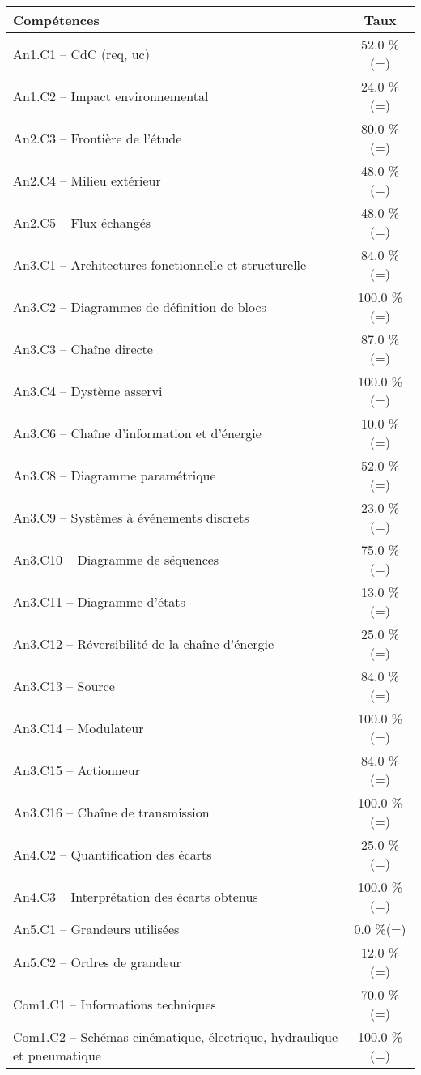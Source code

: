 \footnotesize 
\begin{center} 
\begin{tabular}{|p{.7\linewidth}|c|} 
\hline 
Compétences  & Taux \\ \hline \hline 
An1.C1 -- CdC (req, uc)&52.0 \%(=)\\ \hline 
An1.C2 -- Impact environnemental&24.0 \%(=)\\ \hline 
An2.C3 -- Frontière de l’étude&80.0 \%(=)\\ \hline 
An2.C4 -- Milieu extérieur&48.0 \%(=)\\ \hline 
An2.C5 -- Flux échangés&48.0 \%(=)\\ \hline 
An3.C1 -- Architectures fonctionnelle et structurelle&84.0 \%(=)\\ \hline 
An3.C2 -- Diagrammes de définition de blocs&100.0 \%(=)\\ \hline 
An3.C3 -- Chaîne directe&87.0 \%(=)\\ \hline 
An3.C4 -- Dystème asservi&100.0 \%(=)\\ \hline 
An3.C6 -- Chaîne d’information et d'énergie&10.0 \%(=)\\ \hline 
An3.C8 -- Diagramme paramétrique&52.0 \%(=)\\ \hline 
An3.C9 -- Systèmes à événements discrets&23.0 \%(=)\\ \hline 
An3.C10 -- Diagramme de séquences&75.0 \%(=)\\ \hline 
An3.C11 -- Diagramme d’états&13.0 \%(=)\\ \hline 
An3.C12 -- Réversibilité de la chaîne d’énergie&25.0 \%(=)\\ \hline 
An3.C13 -- Source&84.0 \%(=)\\ \hline 
An3.C14 -- Modulateur&100.0 \%(=)\\ \hline 
An3.C15 -- Actionneur&84.0 \%(=)\\ \hline 
An3.C16 -- Chaîne de transmission&100.0 \%(=)\\ \hline 
An4.C2 -- Quantification des écarts&25.0 \%(=)\\ \hline 
An4.C3 -- Interprétation des écarts obtenus&100.0 \%(=)\\ \hline 
An5.C1 -- Grandeurs utilisées &0.0 \%(=)\\ \hline 
An5.C2 -- Ordres de grandeur&12.0 \%(=)\\ \hline 
Com1.C1 -- Informations techniques&70.0 \%(=)\\ \hline 
Com1.C2 -- Schémas cinématique, électrique, hydraulique et pneumatique&100.0 \%(=)\\ \hline 

\end{tabular}
\end{center}
